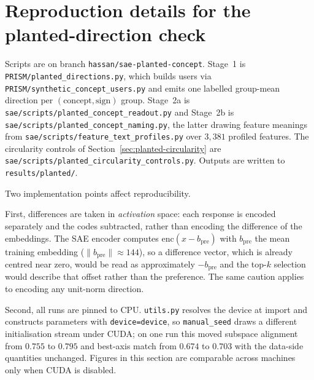 \appendix
\section{Reproduction details for the planted-direction check}
\label{app:planted}

Scripts are on branch \texttt{hassan/sae-planted-concept}. Stage~1 is
\texttt{PRISM/planted\_directions.py}, which builds users via
\texttt{PRISM/synthetic\_concept\_users.py} and emits one labelled group-mean
direction per $(\text{concept},\text{sign})$ group. Stage~2a is
\texttt{sae/scripts/planted\_concept\_readout.py} and Stage~2b is
\texttt{sae/scripts/planted\_concept\_naming.py}, the latter drawing feature
meanings from \texttt{sae/scripts/feature\_text\_profiles.py} over $3{,}381$
profiled features. The circularity controls of
Section~\ref{sec:planted-circularity} are
\texttt{sae/scripts/planted\_circularity\_controls.py}. Outputs are written to
\texttt{results/planted/}.

Two implementation points affect reproducibility.

First, differences are taken in \emph{activation} space: each response is
encoded separately and the codes subtracted, rather than encoding the difference
of the embeddings. The SAE encoder computes $\mathrm{enc}(x - b_{\text{pre}})$
with $b_{\text{pre}}$ the mean training embedding ($\|b_{\text{pre}}\| \approx
144$), so a difference vector, which is already centred near zero, would be read
as approximately $-b_{\text{pre}}$ and the top-$k$ selection would describe that
offset rather than the preference. The same caution applies to encoding any
unit-norm direction.

Second, all runs are pinned to CPU. \texttt{utils.py} resolves the device at
import and constructs parameters with \texttt{device=device}, so
\texttt{manual\_seed} draws a different initialisation stream under CUDA; on one
run this moved subspace alignment from $0.755$ to $0.795$ and best-axis match
from $0.674$ to $0.703$ with the data-side quantities unchanged. Figures in this
section are comparable across machines only when CUDA is disabled.
